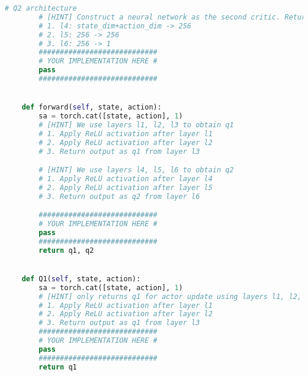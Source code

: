 \documentclass[12pt]{article}
\begin{document}
\begin{solution}
\begin{lstlisting}[language=Python]
        # Q2 architecture
        # [HINT] Construct a neural network as the second critic. Return its value using forward. You need to write down three linear layers.
        # 1. l4: state_dim+action_dim -> 256
        # 2. l5: 256 -> 256
        # 3. l6: 256 -> 1
        ############################
        # YOUR IMPLEMENTATION HERE #
        pass
        ############################


    def forward(self, state, action):
        sa = torch.cat([state, action], 1)
        # [HINT] We use layers l1, l2, l3 to obtain q1
        # 1. Apply ReLU activation after layer l1
        # 2. Apply ReLU activation after layer l2
        # 3. Return output as q1 from layer l3

        # [HINT] We use layers l4, l5, l6 to obtain q2
        # 1. Apply ReLU activation after layer l4
        # 2. Apply ReLU activation after layer l5
        # 3. Return output as q2 from layer l6

        ############################
        # YOUR IMPLEMENTATION HERE #
        pass
        ############################
        return q1, q2


    def Q1(self, state, action):
        sa = torch.cat([state, action], 1)
        # [HINT] only returns q1 for actor update using layers l1, l2, l3
        # 1. Apply ReLU activation after layer l1
        # 2. Apply ReLU activation after layer l2
        # 3. Return output as q1 from layer l3
        ############################
        # YOUR IMPLEMENTATION HERE #
        pass
        ############################
        return q1
\end{lstlisting}
\end{solution}
\end{document}

